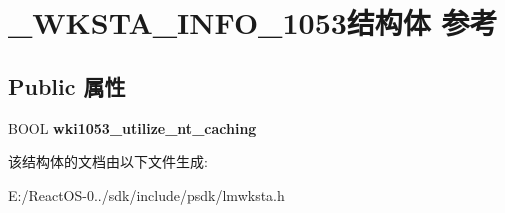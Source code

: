 \hypertarget{struct___w_k_s_t_a___i_n_f_o__1053}{}\section{\+\_\+\+W\+K\+S\+T\+A\+\_\+\+I\+N\+F\+O\+\_\+1053结构体 参考}
\label{struct___w_k_s_t_a___i_n_f_o__1053}
\subsection*{Public 属性}
\begin{DoxyCompactItemize}
\item 
\mbox{\label{struct___w_k_s_t_a___i_n_f_o__1053_a7a9e433ee6a183160e75c2fac198fc13}} 
B\+O\+OL {\bfseries wki1053\+\_\+utilize\+\_\+nt\+\_\+caching}
\end{DoxyCompactItemize}


该结构体的文档由以下文件生成\+:\begin{DoxyCompactItemize}
\item 
E\+:/\+React\+O\+S-\/0../sdk/include/psdk/lmwksta.\+h\end{DoxyCompactItemize}

